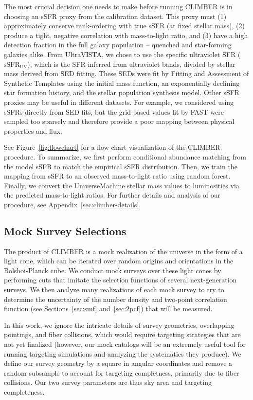 \documentclass[twocolumn,twocolappendix]{aastex63}
\newcommand{\ssfruv}{$\mathrm{sSFR_{UV}}$}
\begin{document}
The most crucial decision one needs to make before running CLIMBER is in choosing an sSFR proxy from the calibration dataset. This proxy must (1) approximately conserve rank-ordering with true sSFR (at fixed stellar mass), (2) produce a tight, negative correlation with mass-to-light ratio, and (3) have a high detection fraction in the full galaxy population -- quenched and star-forming galaxies alike. From UltraVISTA, we chose to use the specific ultraviolet SFR (\ssfruv{}), which is the SFR inferred from ultraviolet bands, divided by stellar mass derived from SED fitting. These SEDs were fit by Fitting and Assessment of Synthetic Templates \citep[FAST;][]{Kriek:2009} using the \citet{Chabrier:2003} initial mass function, an exponentially declining star formation history, and the \citet{Bruzual:Charlot:2003} stellar population synthesis model. Other sSFR proxies may be useful in different datasets. For example, we considered using sSFRs directly from SED fits, but the grid-based values fit by FAST were sampled too sparsely and therefore provide a poor mapping between physical properties and flux. 

See Figure~\ref{fig:flowchart} for a flow chart visualization of the CLIMBER procedure. To summarize, we first perform conditional abundance matching from the model sSFR to match the empirical sSFR distribution. Then, we train the mapping from sSFR to an observed mass-to-light ratio using random forest. Finally, we convert the UniverseMachine stellar mass values to luminosities via the predicted mass-to-light ratios. For further details and analysis of our procedure, see Appendix~\ref{sec:climber-details}.

\subsection{Mock Survey Selections}
\label{sec:selections}

The product of CLIMBER is a mock realization of the universe in the form of a light cone, which can be iterated over random origins and orientations in the Bolshoi-Planck cube. We conduct mock surveys over these light cones by performing cuts that imitate the selection functions of several next-generation surveys. We then analyze many realizations of each mock survey to try to determine the uncertainty of the number density and two-point correlation function (see Sections~\ref{sec:smf} and~\ref{sec:2pcf}) that will be measured.

In this work, we ignore the intricate details of survey geometries, overlapping pointings, and fiber collisions, which would require targeting strategies that are not yet finalized (however, our mock catalogs will be an extremely useful tool for running targeting simulations and analyzing the systematics they produce). We define our survey geometry by a square in angular coordinates and remove a random subsample to account for {targeting completness}, primarily due to fiber collisions. Our two survey parameters are thus sky area and {targeting} completeness.
\end{document}
